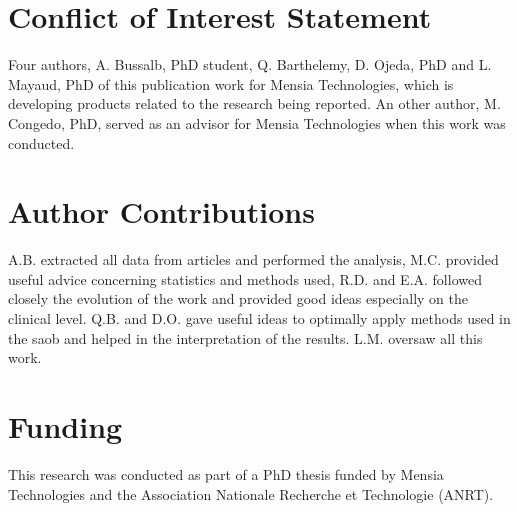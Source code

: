 
\section*{Conflict of Interest Statement}
Four authors, A. Bussalb, PhD student, Q. Barthelemy, D. Ojeda, PhD and L. Mayaud, PhD of this publication work for Mensia Technologies, which is developing products related to the research being reported.
An other author, M. Congedo, PhD, served as an advisor for Mensia Technologies when this work was conducted. 

\section*{Author Contributions}
A.B. extracted all data from articles and performed the analysis,  M.C. provided useful advice concerning statistics and methods used, R.D. and E.A. followed closely the evolution of the work and provided good ideas
especially on the clinical level. Q.B. and D.O. gave useful ideas to optimally apply methods used in the \gls{saob} and helped in the interpretation of the results. L.M. oversaw all this work. 

\section*{Funding}
This research was conducted as part of a PhD thesis funded by Mensia Technologies and the Association Nationale Recherche et Technologie (ANRT).


